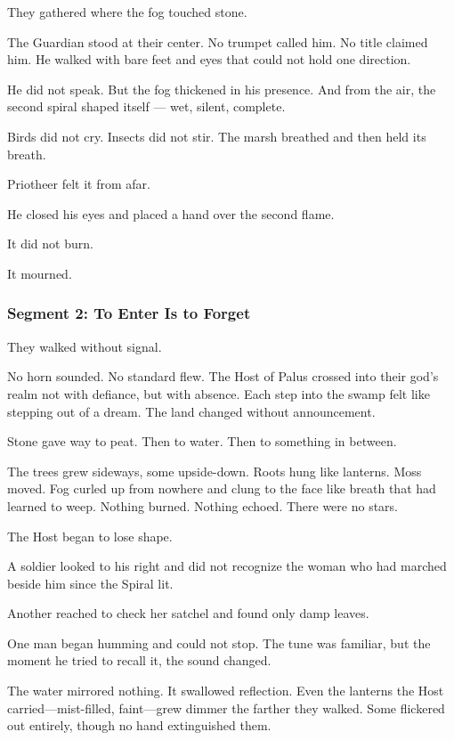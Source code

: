 \documentclass[9pt]{article}
\begin{document}
They gathered where the fog touched stone.

The Guardian stood at their center. No trumpet called him. No title claimed him. He walked with bare feet and eyes that could not hold one direction.

He did not speak. But the fog thickened in his presence. And from the air, the second spiral shaped itself — wet, silent, complete.

Birds did not cry. Insects did not stir. The marsh breathed and then held its breath.

Priotheer felt it from afar.

He closed his eyes and placed a hand over the second flame.

It did not burn.

It mourned.

\newpage

\subsubsection*{Segment 2: To Enter Is to Forget}

They walked without signal.

No horn sounded. No standard flew. The Host of Palus crossed into their god’s realm not with defiance, but with absence. Each step into the swamp felt like stepping out of a dream. The land changed without announcement.

Stone gave way to peat. Then to water. Then to something in between.

The trees grew sideways, some upside-down. Roots hung like lanterns. Moss moved. Fog curled up from nowhere and clung to the face like breath that had learned to weep. Nothing burned. Nothing echoed. There were no stars.

The Host began to lose shape.

A soldier looked to his right and did not recognize the woman who had marched beside him since the Spiral lit.

Another reached to check her satchel and found only damp leaves.

One man began humming and could not stop. The tune was familiar, but the moment he tried to recall it, the sound changed.

The water mirrored nothing. It swallowed reflection. Even the lanterns the Host carried—mist-filled, faint—grew dimmer the farther they walked. Some flickered out entirely, though no hand extinguished them.
\end{document}
